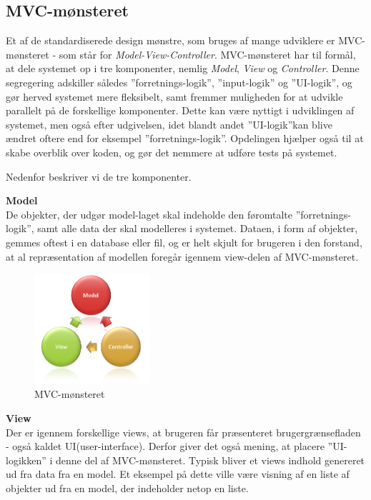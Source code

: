 \subsection{MVC-mønsteret}\label{MVC}

Et af de standardiserede design mønstre, som bruges af mange udviklere er MVC-mønsteret - som står for \textit{Model-View-Controller}.
MVC-mønsteret har til formål, at dele systemet op i tre komponenter, nemlig \textit{Model}, \textit{View} og \textit{Controller}.
Denne segregering adskiller således ''forretnings-logik'', ''input-logik'' og ''UI-logik'', og gør herved systemet mere fleksibelt, samt fremmer muligheden for at udvikle parallelt på de forskellige komponenter.
Dette kan være nyttigt i udviklingen af systemet, men også efter udgivelsen, idet blandt andet ''UI-logik''kan blive ændret oftere end for eksempel ''forretnings-logik''.
Opdelingen hjælper også til at skabe overblik over koden, og gør det nemmere at udføre tests på systemet. \citep{MVC_Overview}

Nedenfor beskriver vi de tre komponenter.

\textbf{Model}\\
De objekter, der udgør model-laget skal indeholde den føromtalte ''forretnings-logik'', samt alle data der skal modelleres i systemet.
Dataen, i form af objekter, gemmes oftest i en database eller fil, og er helt skjult for brugeren i den forstand, at al repræsentation af modellen foregår igennem view-delen af MVC-mønsteret.

\begin{figure}
	\vspace{0pt}
	\begin{center}
		\includegraphics[width=0.38\textwidth]{images/Images/mvc.png}
	\end{center}
	\vspace{-20pt}
	\caption{MVC-mønsteret}
	\vspace{-30pt}
\end{figure}

\textbf{View}\\
Der er igennem forskellige views, at brugeren får præsenteret brugergrænsefladen - også kaldet UI(user-interface).
Derfor giver det også mening, at placere ''UI-logikken'' i denne del af MVC-mønsteret.
Typisk bliver et views indhold genereret ud fra data fra en model.
Et eksempel på dette ville være visning af en liste af objekter ud fra en model, der indeholder netop en liste.

